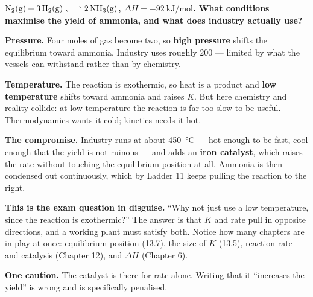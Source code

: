 \documentclass{apchem-worksheet}
\begin{document}
\begin{center}
\end{center}

\begin{workedexample}
\textbf{$\ce{N2(g) + 3H2(g) <=> 2NH3(g)}$, $\Delta H =
\SI{-92}{\kilo\joule\per\mole}$. What conditions maximise the yield of
ammonia, and what does industry actually use?}

\textbf{Pressure.} Four moles of gas become two, so \textbf{high
pressure} shifts the equilibrium toward ammonia. Industry uses roughly
\SI{200}{\atm} --- limited by what the vessels can withstand rather
than by chemistry.

\textbf{Temperature.} The reaction is exothermic, so heat is a product
and \textbf{low temperature} shifts toward ammonia and raises $K$. But
here chemistry and reality collide: at low temperature the reaction is
far too slow to be useful. Thermodynamics wants it cold; kinetics needs
it hot.

\textbf{The compromise.} Industry runs at about
\SI{450}{\celsius} --- hot enough to be fast, cool enough that the
yield is not ruinous --- and adds an \textbf{iron catalyst}, which
raises the rate without touching the equilibrium position at all.
Ammonia is then condensed out continuously, which by Ladder 11 keeps
pulling the reaction to the right.

\textbf{This is the exam question in disguise.} ``Why not just use a low
temperature, since the reaction is exothermic?'' The answer is that
$K$ and rate pull in opposite directions, and a working plant must
satisfy both. Notice how many chapters are in play at once: equilibrium
position (13.7), the size of $K$ (13.5), reaction rate and catalysis
(Chapter 12), and $\Delta H$ (Chapter 6).

\textbf{One caution.} The catalyst is there for rate alone. Writing that
it ``increases the yield'' is wrong and is specifically penalised.
\end{workedexample}
\end{document}
